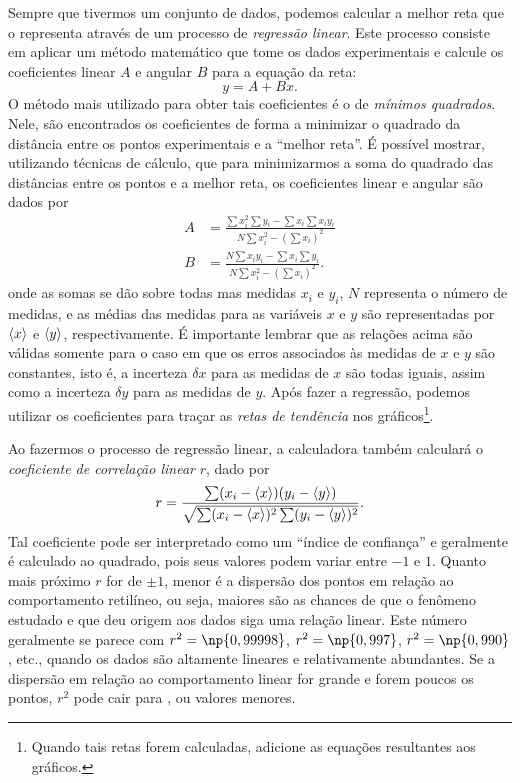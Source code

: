 Sempre que tivermos um conjunto de dados, podemos calcular a melhor reta que o representa através de um processo de \emph{regressão linear}. Este processo consiste em aplicar um método matemático que tome os dados experimentais e calcule os coeficientes linear $A$ e angular $B$ para a equação da reta:
\begin{equation}
	y = A + Bx.
\end{equation}
%
O método mais utilizado para obter tais coeficientes é o de \emph{mínimos quadrados}. Nele, são encontrados os coeficientes de forma a minimizar o quadrado da distância entre os pontos experimentais e a ``melhor reta''. 
%
É possível mostrar\cite{Taylor}, utilizando técnicas de cálculo, que para minimizarmos a soma do quadrado das distâncias entre os pontos e a melhor reta, os coeficientes linear e angular são dados por
\begin{align}
	A &= \frac{\sum x_i^2 \sum y_i - \sum x_i \sum x_iy_i}{N \sum x_i^2 - (\sum x_i)^2} \\
	B &= \frac{N\sum x_iy_i - \sum x_i \sum y_i}{N \sum x_i^2 - (\sum x_i)^2}.
\end{align}
%
onde as somas se dão sobre todas mas medidas $x_i$ e $y_i$, $N$ representa o número de medidas, e as médias das medidas para as variáveis $x$ e $y$ são representadas por $\left\langle{x}\right\rangle$ e $\left\langle{y}\right\rangle$, respectivamente. É importante lembrar que as relações acima são válidas somente para o caso em que os erros associados às medidas de $x$ e $y$ são constantes, isto é, a incerteza $\delta x$ para as medidas de $x$ são todas iguais, assim como a incerteza $\delta y$ para as medidas de $y$. Após fazer a regressão, podemos utilizar os coeficientes para traçar as \emph{retas de tendência} nos gráficos\footnote{Quando tais retas forem calculadas, adicione as equações resultantes aos gráficos.}.

Ao fazermos o processo de regressão linear, a calculadora também calculará o \emph{coeficiente de correlação linear} $r$, dado por
\begin{equation}
	r = \frac{\sum (x_i - \left\langle{x}\right\rangle)(y_i-\left\langle{y}\right\rangle)}{\sqrt{\sum(x_i - \left\langle{x}\right\rangle)^2\sum (y_i - \left\langle{y}\right\rangle)^2}}.
\end{equation}
%
Tal coeficiente pode ser interpretado como um ``índice de confiança'' e geralmente é calculado ao quadrado, pois seus valores podem variar entre $-1$ e $1$. Quanto mais próximo $r$ for de $\pm 1$, menor é a dispersão dos pontos em relação ao comportamento retilíneo, ou seja, maiores são as chances de que o fenômeno estudado e que deu origem aos dados siga uma relação linear. Este número geralmente se parece com $r^2=\np{0,99998}$, $r^2=\np{0,997}$, $r^2= \np{0,990}$, etc., quando os dados são altamente lineares e relativamente abundantes. Se a dispersão em relação ao comportamento linear for grande e forem poucos os pontos, $r^2$ pode cair para , ou valores menores.

